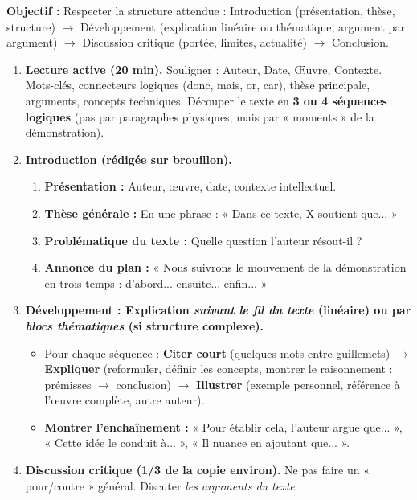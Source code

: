 \documentclass[11pt]{article}
\begin{document}
\begin{methode}
    \textbf{Objectif :} Respecter la structure attendue : Introduction (présentation, thèse, structure) $\rightarrow$ Développement (explication linéaire ou thématique, argument par argument) $\rightarrow$ Discussion critique (portée, limites, actualité) $\rightarrow$ Conclusion.
    \begin{enumerate}
        \item \textbf{Lecture active (20 min).} Souligner : Auteur, Date, Œuvre, Contexte. Mots-clés, connecteurs logiques (donc, mais, or, car), thèse principale, arguments, concepts techniques. Découper le texte en \textbf{3 ou 4 séquences logiques} (pas par paragraphes physiques, mais par « moments » de la démonstration).
        \item \textbf{Introduction (rédigée sur brouillon).}
        \begin{enumerate}
            \item \textbf{Présentation :} Auteur, œuvre, date, contexte intellectuel.
            \item \textbf{Thèse générale :} En une phrase : « Dans ce texte, X soutient que... »
            \item \textbf{Problématique du texte :} Quelle question l'auteur résout-il ?
            \item \textbf{Annonce du plan :} « Nous suivrons le mouvement de la démonstration en trois temps : d'abord... ensuite... enfin... »
        \end{enumerate}
        \item \textbf{Développement : Explication \emph{suivant le fil du texte} (linéaire) ou par \emph{blocs thématiques} (si structure complexe).}
        \begin{itemize}
            \item Pour chaque séquence : \textbf{Citer court} (quelques mots entre guillemets) $\rightarrow$ \textbf{Expliquer} (reformuler, définir les concepts, montrer le raisonnement : prémisses $\rightarrow$ conclusion) $\rightarrow$ \textbf{Illustrer} (exemple personnel, référence à l'œuvre complète, autre auteur).
            \item \textbf{Montrer l'enchaînement :} « Pour établir cela, l'auteur argue que... », « Cette idée le conduit à... », « Il nuance en ajoutant que... ».
        \end{itemize}
        \item \textbf{Discussion critique (1/3 de la copie environ).} Ne pas faire un « pour/contre » général. Discuter \emph{les arguments du texte}.

\end{enumerate}
\end{methode}
\end{document}
